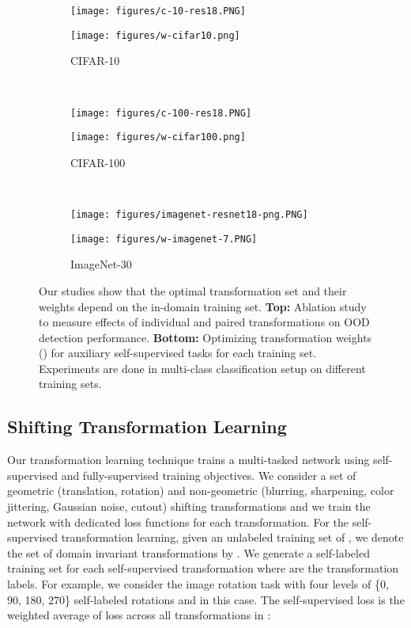 \documentclass[letterpaper]{article} \usepackage{aaai22}  \usepackage{times}  \usepackage{helvet}  \usepackage{courier}  \usepackage[hyphens]{url}  \usepackage{graphicx} \urlstyle{rm} \def\UrlFont{\rm}  \usepackage{natbib}  \usepackage{caption} \DeclareCaptionStyle{ruled}{labelfont=normalfont,labelsep=colon,strut=off} \frenchspacing  \setlength{\pdfpagewidth}{8.5in}  \setlength{\pdfpageheight}{11in}
\newcommand{\rulesep}{\unskip\ \vrule\ }
\begin{document}
\begin{figure*}[t]
\vskip 0.1in
\begin{center}
\begin{subfigure}[b]{0.32\textwidth}
\centerline{\texttt{[image: figures/c-10-res18.PNG]}}
        \vskip 0.1in
        \centerline{\texttt{[image: figures/w-cifar10.png]}}
        \caption{CIFAR-10}
    \end{subfigure}
    \rulesep
    \begin{subfigure}[b]{0.32\textwidth}
\centerline{\texttt{[image: figures/c-100-res18.PNG]}}
        \vskip 0.1in
        \centerline{\texttt{[image: figures/w-cifar100.png]}}
        \caption{CIFAR-100}
    \end{subfigure}
    \rulesep
    \begin{subfigure}[b]{0.32\textwidth}
\centerline{\texttt{[image: figures/imagenet-resnet18-png.PNG]}}
        \vskip 0.05in
        \centerline{\texttt{[image: figures/w-imagenet-7.PNG]}}
        \caption{ImageNet-30}
    \end{subfigure}
\caption{Our studies show that the optimal transformation set  and their weights  depend on the in-domain training set. \textbf{Top:} Ablation study to measure effects of individual and paired transformations on OOD detection performance. \textbf{Bottom:} Optimizing transformation weights () for auxiliary self-supervised tasks for each training set. Experiments are done in multi-class classification setup on different training sets.}
\label{fig:all-trans}
\end{center}
\vskip -0.2in
\end{figure*} 

\subsection{Shifting Transformation Learning} \label{sec:losses}
Our transformation learning technique trains a multi-tasked network using self-supervised and fully-supervised training objectives. We consider a set of geometric (translation, rotation) and non-geometric (blurring, sharpening, color jittering, Gaussian noise, cutout) shifting transformations and we train the network with dedicated loss functions for each transformation.  
For the self-supervised transformation learning, given an unlabeled training set of  , we denote the set of domain invariant transformations  by . 
We generate a self-labeled training set  for each self-supervised transformation  where  are the transformation labels. 
For example, we consider the image rotation task with four levels of \{0, 90, 180, 270\} self-labeled rotations and  in this case. 
The self-supervised loss  is the weighted average of loss across all transformations in :
\end{document}
